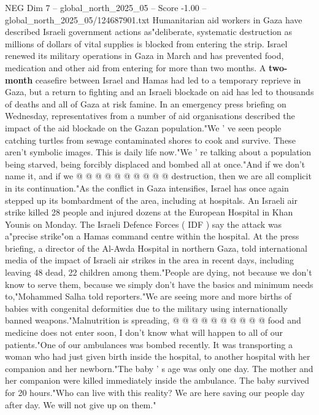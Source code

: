 \begin{textsample}{NEG Dim 7 – global\_north\_2025\_05 – Score -1.00 – global\_north\_2025\_05/124687901.txt}  \label{ex:f7_neg_124}
Humanitarian aid workers in Gaza have described Israeli government actions as"deliberate, systematic destruction as millions of dollars of vital supplies is blocked from entering the strip.
Israel renewed its military operations in Gaza in March and has prevented food, medication and other aid from entering for more than two months.
A \textbf{two-month} ceasefire between Israel and Hamas had led to a temporary reprieve in Gaza, but a return to fighting and an Israeli blockade on aid has led to thousands of deaths and all of Gaza at risk famine.
In an emergency press briefing on Wednesday, representatives from a number of aid organisations described the impact of the aid blockade on the Gazan population."We ' ve seen people catching turtles from sewage contaminated shores to cook and survive.
These aren't symbolic images.
This is daily life now."We ' re talking about a population being starved, being forcibly displaced and bombed all at once."And if we don't name it, and if we @ @ @ @ @ @ @ @ @ @ destruction, then we are all complicit in its continuation."As the conflict in Gaza intensifies, Israel has once again stepped up its bombardment of the area, including at hospitals.
An Israeli air strike killed 28 people and injured dozens at the European Hospital in Khan Younis on Monday.
The Israeli Defence Forces ( IDF ) say the attack was a"precise strike"on a Hamas command centre within the hospital.
At the press briefing, a director of the Al-Awda Hospital in northern Gaza, told international media of the impact of Israeli air strikes in the area in recent days, including leaving 48 dead, 22 children among them."People are dying, not because we don't know to serve them, because we simply don't have the basics and minimum needs to,"Mohammed Salha told reporters."We are seeing more and more births of babies with congenital deformities due to the military using internationally banned weapons."Malnutrition is spreading, @ @ @ @ @ @ @ @ @ @ food and medicine does not enter soon, I don't know what will happen to all of our patients."One of our ambulances was bombed recently.
It was transporting a woman who had just given birth inside the hospital, to another hospital with her companion and her newborn."The baby ' s age was only one day.
The mother and her companion were killed immediately inside the ambulance.
The baby survived for 20 hours."Who can live with this reality?
We are here saving our people day after day.
We will not give up on them."

\end{textsample}
